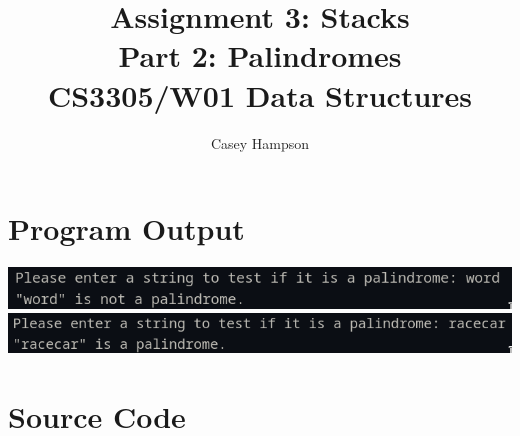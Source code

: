 \documentclass{article}
\title{Assignment 3: Stacks \\[5pt] Part 2: Palindromes \\[8pt] CS3305/W01 Data Structures}
\author{Casey Hampson}
\begin{document}
    \maketitle


\section*{Program Output}
\includegraphics[scale=0.6]{res/1.png} \\
\includegraphics[scale=0.6]{res/2.png}



\pagebreak
\section*{Source Code}
\inputminted{java}{./P2.java}
\end{document}

